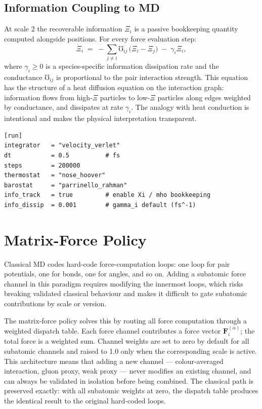\documentclass[11pt,a4paper]{article}
\newcommand{\Rec}{\Xi}
\newcommand{\Cond}{\mho}
\newcommand{\Fvec}{\mathbf{F}}
\begin{document}
\subsection{Information Coupling to MD}

At scale 2 the recoverable information $\Rec_i$ is a passive bookkeeping
quantity computed alongside positions.  For every force evaluation step:
\[
  \dot{\Rec}_i \;=\;
  -\sum_{j \neq i} \Cond_{ij} \,\bigl(\Rec_i - \Rec_j\bigr)
  \;-\; \gamma_i \Rec_i ,
\]
where $\gamma_i \geq 0$ is a species-specific information dissipation rate and
the conductance $\Cond_{ij}$ is proportional to the pair interaction strength.
This equation has the structure of a heat diffusion equation on the interaction
graph: information flows from high-$\Rec$ particles to low-$\Rec$ particles
along edges weighted by conductance, and dissipates at rate $\gamma_i$.
The analogy with heat conduction is intentional and makes the physical
interpretation transparent.

\begin{lstlisting}[language={}, caption={Classical MD configuration block (reference scripting format).}]
[run]
integrator   = "velocity_verlet"
dt           = 0.5          # fs
steps        = 200000
thermostat   = "nose_hoover"
barostat     = "parrinello_rahman"
info_track   = true         # enable Xi / mho bookkeeping
info_dissip  = 0.001        # gamma_i default (fs^-1)
\end{lstlisting}

\section{Matrix-Force Policy}\label{sec:matforce}

Classical MD codes hard-code force-computation loops: one loop for pair
potentials, one for bonds, one for angles, and so on.  Adding a subatomic
force channel in this paradigm requires modifying the innermost loops, which
risks breaking validated classical behaviour and makes it difficult to gate
subatomic contributions by scale or version.

The matrix-force policy solves this by routing all force computation through
a weighted dispatch table.  Each force channel contributes a force vector
$\Fvec_i^{(\alpha)}$; the total force is a weighted sum.  Channel weights
are set to zero by default for all subatomic channels and raised to 1.0 only
when the corresponding scale is active.  This architecture means that adding
a new channel --- colour-averaged interaction, gluon proxy, weak proxy ---
never modifies an existing channel, and can always be validated in isolation
before being combined.  The classical path is preserved exactly: with all
subatomic weights at zero, the dispatch table produces the identical result
to the original hard-coded loops.
\end{document}
